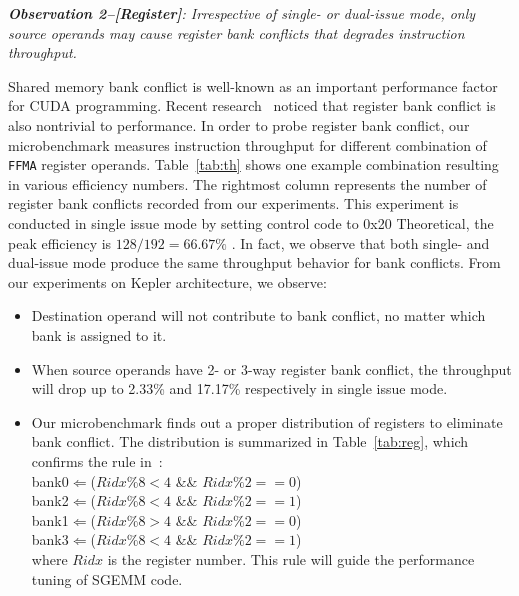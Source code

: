 {\em {\bf Observation 2--[Register]}: 
Irrespective of single- or dual-issue mode, only source operands may cause register bank conflicts that degrades instruction throughput.}

Shared memory bank conflict is well-known as an important performance factor for CUDA programming.
Recent research~\cite{lai} noticed that register bank conflict is also nontrivial to performance. 
In order to probe 
register bank conflict, our microbenchmark measures instruction throughput for different combination of {\tt FFMA} 
register operands. 
Table~\ref{tab:th} shows one example combination resulting in various efficiency numbers. 
The rightmost column represents the number of register bank conflicts recorded from our experiments. 
This experiment is conducted 
in single issue mode by setting control code to 0x20 %
Theoretical, the peak efficiency is $128/192=66.67\%$ . 
In fact, we observe that both single- and dual-issue mode produce the same throughput behavior for bank conflicts.
From our experiments on Kepler architecture, we observe:
\begin{itemize}
\item Destination operand will not contribute to bank conflict, no matter which bank is assigned to it.
\item When source operands have 2- or 3-way register bank conflict, the throughput will drop up to 2.33\% and 17.17\% respectively in single issue mode. 
\item Our microbenchmark finds out a proper distribution of registers to eliminate bank
     conflict. 
     The distribution is summarized in Table~\ref{tab:reg}, which confirms the rule in~\cite{lai}: \\
 bank0$\Leftarrow$($Ridx \% 8 < 4$ \&\& $Ridx \% 2 == 0$) \\
 bank2$\Leftarrow$($Ridx \% 8 < 4$ \&\& $Ridx \% 2 == 1$) \\
bank1$\Leftarrow$($Ridx \% 8 > 4$ \&\& $Ridx \%2 == 0$) \\
bank3$\Leftarrow$($Ridx \% 8 < 4$ \&\& $Ridx\% 2 == 1$)\\
where $Ridx$ is the register number. 
This rule will guide the performance tuning of SGEMM code.

\end{itemize}

